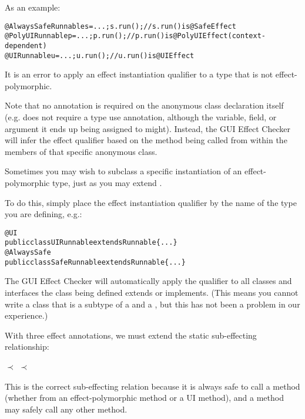 As an example:

\begin{alltt}
@AlwaysSafe Runnable s = ...;    s.run();    // s.run() is @SafeEffect
@PolyUI Runnable p = ...;        p.run();    // p.run() is @PolyUIEffect (context-dependent)
@UI Runnable u = ...;            u.run();    // u.run() is @UIEffect
\end{alltt}

It is an error to apply an effect instantiation qualifier to a type that is not effect-polymorphic.

Note that no annotation is required on the anonymous class declaration itself (e.g. 
does not require a type use annotation, although the variable, field, or argument it ends up being assigned to might).
Instead, the GUI Effect Checker will infer the effect qualifier based on the method being called from within the
members of that specific anonymous class.


Sometimes you may wish to subclass a specific instantiation of an effect-polymorphic type, just as
you may extend .

To do this, simply place the effect instantiation qualifier by the name of the type you are
defining, e.g.:

\begin{alltt}
@UI
public class UIRunnable extends Runnable \{...\}
@AlwaysSafe
public class SafeRunnable extends Runnable \{...\}
\end{alltt}
The GUI Effect Checker will automatically apply the qualifier to all classes and interfaces the class
being defined extends or implements.  (This means you cannot write a class that is a subtype of a
 and a , but this has not been a problem in our experience.)



With three effect annotations, we must extend the static sub-effecting relationship:

\centerline{ $\prec$  $\prec$ }

\noindent
This is the correct sub-effecting relation because it is always safe to
call a 
method (whether from an effect-polymorphic method or a UI method), and a  method
may safely call any other method.

